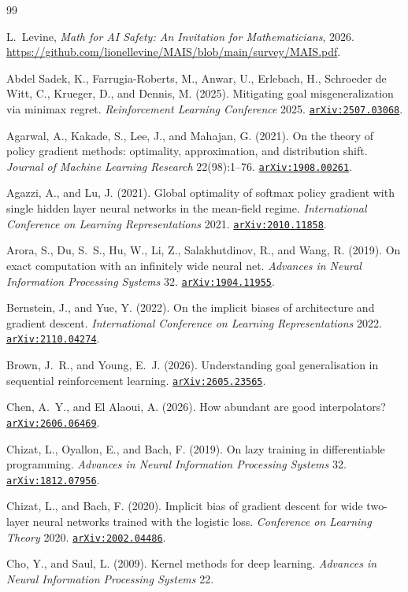 \documentclass[11pt]{amsart}
\newcommand{\arxiv}[1]{\href{https://arxiv.org/abs/#1}{\texttt{arXiv:#1}}}
\theoremstyle{plain}
\theoremstyle{definition}
\begin{document}
\begin{thebibliography}{99}

L.~Levine,
\emph{Math for AI Safety: An Invitation for Mathematicians},
2026. \url{https://github.com/lionellevine/MAIS/blob/main/survey/MAIS.pdf}.


 Abdel Sadek, K., Farrugia-Roberts, M., Anwar, U., Erlebach, H., Schroeder de Witt, C., Krueger, D., and Dennis, M. (2025). Mitigating goal misgeneralization via minimax regret. \emph{Reinforcement Learning Conference} 2025. \arxiv{2507.03068}.

 Agarwal, A., Kakade, S., Lee, J., and Mahajan, G. (2021). On the theory of policy gradient methods: optimality, approximation, and distribution shift. \emph{Journal of Machine Learning Research} 22(98):1--76. \arxiv{1908.00261}.

 Agazzi, A., and Lu, J. (2021). Global optimality of softmax policy gradient with single hidden layer neural networks in the mean-field regime. \emph{International Conference on Learning Representations} 2021. \arxiv{2010.11858}.

 Arora, S., Du, S.~S., Hu, W., Li, Z., Salakhutdinov, R., and Wang, R. (2019). On exact computation with an infinitely wide neural net. \emph{Advances in Neural Information Processing Systems} 32. \arxiv{1904.11955}.

 Bernstein, J., and Yue, Y. (2022). On the implicit biases of architecture and gradient descent. \emph{International Conference on Learning Representations} 2022. \arxiv{2110.04274}.

 Brown, J.~R., and Young, E.~J. (2026). Understanding goal generalisation in sequential reinforcement learning. \arxiv{2605.23565}.

 Chen, A.~Y., and El Alaoui, A. (2026). How abundant are good interpolators? \arxiv{2606.06469}.

 Chizat, L., Oyallon, E., and Bach, F. (2019). On lazy training in differentiable programming. \emph{Advances in Neural Information Processing Systems} 32. \arxiv{1812.07956}.

 Chizat, L., and Bach, F. (2020). Implicit bias of gradient descent for wide two-layer neural networks trained with the logistic loss. \emph{Conference on Learning Theory} 2020. \arxiv{2002.04486}.

 Cho, Y., and Saul, L. (2009). Kernel methods for deep learning. \emph{Advances in Neural Information Processing Systems} 22.


\end{thebibliography}
\end{document}
